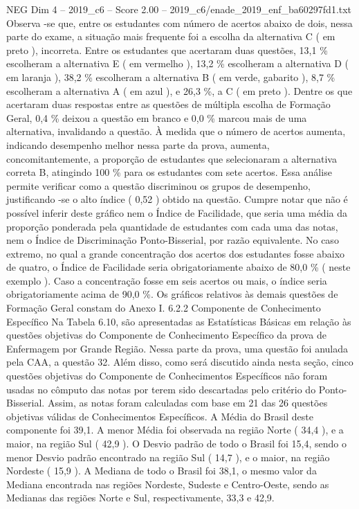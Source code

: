 \begin{textsample}{NEG Dim 4 – 2019\_c6 – Score 2.00 – 2019\_c6/enade\_2019\_enf\_ba60297fd1.txt}
Observa -se que, entre os estudantes com número de acertos abaixo de dois, nessa parte do exame, a situação mais frequente foi a escolha da alternativa C ( em preto ), incorreta.
Entre os estudantes que acertaram duas questões, 13,1 \% escolheram a alternativa E ( em vermelho ), 13,2 \% escolheram a alternativa D ( em laranja ), 38,2 \% escolheram a alternativa B ( em verde, gabarito ), 8,7 \% escolheram a alternativa A ( em azul ), e 26,3 \%, a C ( em preto ).
Dentre os que acertaram duas respostas entre as questões de múltipla escolha de Formação Geral, 0,4 \% deixou a questão em branco e 0,0 \% marcou mais de uma alternativa, invalidando a questão.
À medida que o número de acertos aumenta, indicando desempenho melhor nessa parte da prova, aumenta, concomitantemente, a proporção de estudantes que selecionaram a alternativa correta B, atingindo 100 \% para os estudantes com sete acertos.
Essa análise permite verificar como a questão discriminou os grupos de desempenho, justificando -se o alto índice ( 0,52 ) obtido na questão.
Cumpre notar que não é possível inferir deste gráfico nem o Índice de Facilidade, que seria uma média da proporção ponderada pela quantidade de estudantes com cada uma das notas, nem o Índice de Discriminação Ponto-Bisserial, por razão equivalente.
No caso extremo, no qual a grande concentração dos acertos dos estudantes fosse abaixo de quatro, o Índice de Facilidade seria obrigatoriamente abaixo de 80,0 \% ( neste exemplo ).
Caso a concentração fosse em seis acertos ou mais, o índice seria obrigatoriamente acima de 90,0 \%.
Os gráficos relativos às demais questões de Formação Geral constam do Anexo I. 6.2.2 Componente de Conhecimento Específico Na Tabela 6.10, são apresentadas as Estatísticas Básicas em relação às questões objetivas do Componente de Conhecimento Específico da prova de Enfermagem por Grande Região.
Nessa parte da prova, uma questão foi anulada pela CAA, a questão 32.
Além disso, como será discutido ainda nesta seção, cinco questões objetivas do Componente de Conhecimentos Específicos não foram usadas no cômputo das notas por terem sido descartadas pelo critério do Ponto-Bisserial.
Assim, as notas foram calculadas com base em 21 das 26 questões objetivas válidas de Conhecimentos Específicos.
A Média do Brasil deste componente foi 39,1.
A menor Média foi observada na região Norte ( 34,4 ), e a maior, na região Sul ( 42,9 ).
O Desvio padrão de todo o Brasil foi 15,4, sendo o menor Desvio padrão encontrado na região Sul ( 14,7 ), e o maior, na região Nordeste ( 15,9 ).
A Mediana de todo o Brasil foi 38,1, o mesmo valor da Mediana encontrada nas regiões Nordeste, Sudeste e Centro-Oeste, sendo as Medianas das regiões Norte e Sul, respectivamente, 33,3 e 42,9.

\end{textsample}
